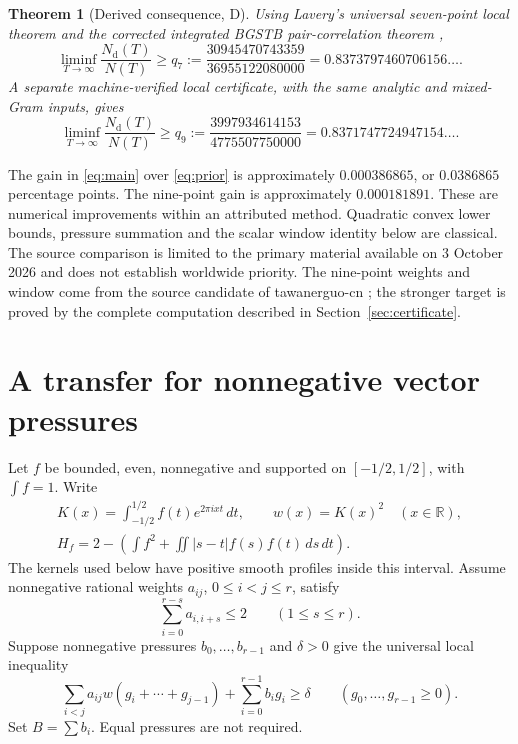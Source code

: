\documentclass[11pt]{article}
\newcommand{\Nd}{N_{\mathrm d}}
\newcommand{\R}{\mathbb R}
\newtheorem{theorem}{Theorem}
\theoremstyle{remark}\newtheorem{remark}[theorem]{Remark}
\begin{document}
\begin{theorem}[Derived consequence, D]\label{thm:main}
Using Lavery's universal seven-point local theorem \cite{lavery} and the
corrected integrated BGSTB pair-correlation theorem \cite{bgstb,correction},
\begin{equation}\label{eq:main}
 \liminf_{T\to\infty}\frac{\Nd(T)}{N(T)}
 \ge q_7:=\frac{30945470743359}{36955122080000}
 =0.8373797460706156\ldots .
\end{equation}
A separate machine-verified local certificate, with the same analytic and
mixed-Gram inputs, gives
\begin{equation}\label{eq:nine}
 \liminf_{T\to\infty}\frac{\Nd(T)}{N(T)}
 \ge q_9:=\frac{3997934614153}{4775507750000}
 =0.8371747724947154\ldots .
\end{equation}
\end{theorem}

The gain in \eqref{eq:main} over \eqref{eq:prior} is approximately
$0.000386865$, or $0.0386865$ percentage points. The nine-point gain is
approximately $0.000181891$. These are numerical improvements within an
attributed method. Quadratic convex lower bounds, pressure summation and the
scalar window identity below are classical. The source comparison is limited
to the primary material available on 3 October 2026 and does not establish
worldwide priority. The nine-point weights and window come from the source
candidate of tawanerguo-cn \cite{tawan}; the stronger target is proved by the
complete computation described in Section~\ref{sec:certificate}.

\section{A transfer for nonnegative vector pressures}
Let $f$ be bounded, even, nonnegative and supported on $[-1/2,1/2]$, with
$\int f=1$. Write
\begin{gather*}
 K(x)=\int_{-1/2}^{1/2} f(t)e^{2\pi ixt}\,dt,\qquad w(x)=K(x)^2
 \quad(x\in\R),\\
 H_f=2-\left(\int f^2+\iint |s-t|f(s)f(t)\,ds\,dt\right).
\end{gather*}
The kernels used below have positive smooth profiles inside this interval.
Assume nonnegative rational weights $a_{ij}$, $0\le i<j\le r$, satisfy
\begin{equation}\label{eq:capacity}
 \sum_{i=0}^{r-s}a_{i,i+s}\le2\qquad(1\le s\le r).
\end{equation}
Suppose nonnegative pressures $b_0,\ldots,b_{r-1}$ and $\delta>0$ give
the universal local inequality
\begin{equation}\label{eq:local}
 \sum_{i<j}a_{ij}w(g_i+\cdots+g_{j-1})+
 \sum_{i=0}^{r-1}b_i g_i\ge\delta
 \qquad(g_0,\ldots,g_{r-1}\ge0).
\end{equation}
Set $B=\sum b_i$. Equal pressures are not required.
\end{document}
